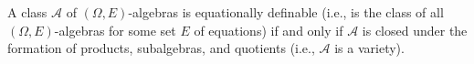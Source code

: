 A class $\mathcal{A}$ of $(\Omega, E)$-algebras is equationally definable (i.e., is the class of all $(\Omega, E)$-algebras for some set $E$ of equations) if and only if $\mathcal{A}$ is closed under the formation of products, subalgebras, and quotients (i.e., $\mathcal{A}$ is a variety).
